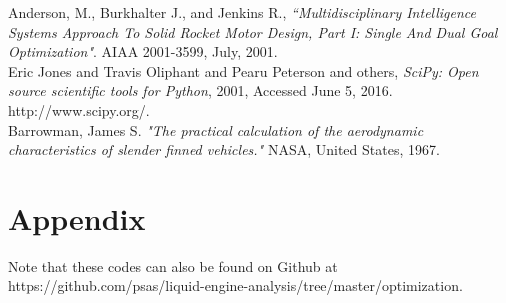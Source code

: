 \documentclass[]{aiaa-tc}%
\begin{document}
\begin{thebibliography}{9}
Anderson, M., Burkhalter J., and Jenkins R., {\it “Multidisciplinary Intelligence Systems Approach To Solid Rocket Motor Design, Part I: Single And Dual Goal Optimization"}. AIAA 2001-3599, July, 2001.\\

Eric Jones and Travis Oliphant and Pearu Peterson and others, {\it SciPy: Open source scientific tools for Python}, 2001, Accessed June 5, 2016. http://www.scipy.org/.\\

Barrowman, James S. {\it "The practical calculation of the aerodynamic characteristics of slender finned vehicles."} NASA, United States, 1967.

\end{thebibliography}

\newpage
\pagestyle{empty}
\section*{Appendix}
Note that these codes can also be found on Github at\\ https://github.com/psas/liquid-engine-analysis/tree/master/optimization.
\end{document}
